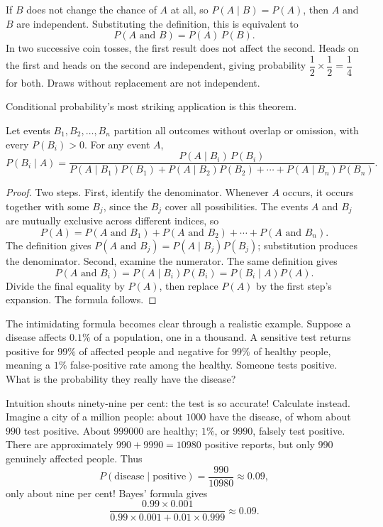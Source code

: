 If $B$ does not change the chance of $A$ at all, so $P(A\mid B)=P(A)$, then $A$ and $B$ are independent. Substituting the definition, this is equivalent to
\[
P(A\text{ and }B)=P(A)\,P(B).
\]
In two successive coin tosses, the first result does not affect the second. Heads on the first and heads on the second are independent, giving probability $\dfrac{1}{2}\times\dfrac{1}{2}=\dfrac{1}{4}$ for both. Draws without replacement are not independent.

Conditional probability's most striking application is this theorem.

\begin{dingli}
Let events $B_1,B_2,\dots,B_n$ partition all outcomes without overlap or omission, with every $P(B_i)>0$. For any event $A$,
\[
P(B_i\mid A)=\frac{P(A\mid B_i)\,P(B_i)}{P(A\mid B_1)P(B_1)+P(A\mid B_2)P(B_2)+\cdots+P(A\mid B_n)P(B_n)}.
\]
\end{dingli}

\begin{proof}
Two steps. First, identify the denominator. Whenever $A$ occurs, it occurs together with some $B_j$, since the $B_j$ cover all possibilities. The events $A$ and $B_j$ are mutually exclusive across different indices, so
\[
P(A)=P(A\text{ and }B_1)+P(A\text{ and }B_2)+\cdots+P(A\text{ and }B_n).
\]
The definition gives $P(A\text{ and }B_j)=P(A\mid B_j)P(B_j)$; substitution produces the denominator. Second, examine the numerator. The same definition gives
\[
P(A\text{ and }B_i)=P(A\mid B_i)P(B_i)=P(B_i\mid A)P(A).
\]
Divide the final equality by $P(A)$, then replace $P(A)$ by the first step's expansion. The formula follows.
\end{proof}

The intimidating formula becomes clear through a realistic example. Suppose a disease affects $0.1\%$ of a population, one in a thousand. A sensitive test returns positive for $99\%$ of affected people and negative for $99\%$ of healthy people, meaning a $1\%$ false-positive rate among the healthy. Someone tests positive. What is the probability they really have the disease?

Intuition shouts ninety-nine per cent: the test is so accurate! Calculate instead. Imagine a city of a million people: about $1000$ have the disease, of whom about $990$ test positive. About $999000$ are healthy; $1\%$, or $9990$, falsely test positive. There are approximately $990+9990=10980$ positive reports, but only $990$ genuinely affected people. Thus
\[
P(\text{disease}\mid\text{positive})=\frac{990}{10980}\approx 0.09,
\]
only about nine per cent! Bayes' formula gives
\[
\frac{0.99\times 0.001}{0.99\times 0.001+0.01\times 0.999}\approx 0.09.
\]


